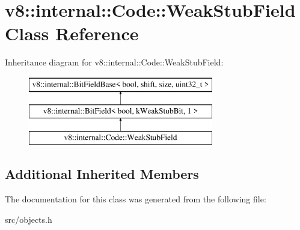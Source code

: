 \hypertarget{classv8_1_1internal_1_1_code_1_1_weak_stub_field}{}\section{v8\+:\+:internal\+:\+:Code\+:\+:Weak\+Stub\+Field Class Reference}
\label{classv8_1_1internal_1_1_code_1_1_weak_stub_field}
Inheritance diagram for v8\+:\+:internal\+:\+:Code\+:\+:Weak\+Stub\+Field\+:\begin{figure}[H]
\begin{center}
\leavevmode
\includegraphics[height=3.000000cm]{classv8_1_1internal_1_1_code_1_1_weak_stub_field}
\end{center}
\end{figure}
\subsection*{Additional Inherited Members}


The documentation for this class was generated from the following file\+:\begin{DoxyCompactItemize}
\item 
src/objects.\+h\end{DoxyCompactItemize}
